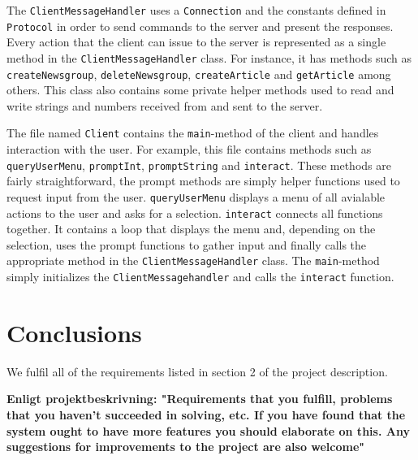 \documentclass[a4paper]{article}
\begin{document}
The \texttt{ClientMessageHandler} uses a \texttt{Connection} and the constants defined in \texttt{Protocol} in order to send commands to the server and present the responses. Every action that the client can issue to the server is represented as a single method in the \texttt{ClientMessageHandler} class. For instance, it has methods such as \texttt{createNewsgroup}, \texttt{deleteNewsgroup}, \texttt{createArticle} and \texttt{getArticle} among others. This class also contains some private helper methods used to read and write strings and numbers received from and sent to the server.

The file named \texttt{Client} contains the \texttt{main}-method of the client and handles interaction with the user. For example, this file contains methods such as \texttt{queryUserMenu}, \texttt{promptInt}, \texttt{promptString} and \texttt{interact}. These methods are fairly straightforward, the prompt methods are simply helper functions used to request input from the user. \texttt{queryUserMenu} displays a menu of all avialable actions to the user and asks for a selection. \texttt{interact} connects all functions together. It contains a loop that displays the menu and, depending on the selection, uses the prompt functions to gather input and finally calls the appropriate method in the \texttt{ClientMessageHandler} class. The \texttt{main}-method simply initializes the \texttt{ClientMessagehandler} and calls the \texttt{interact} function.

\section{Conclusions}
We fulfil all of the requirements listed in section 2 of the project description.


\textbf{Enligt projektbeskrivning:
"Requirements that you fulfill, problems that you haven’t succeeded in solving,
etc. If you have found that the system ought to have more features you should elaborate on
this. Any suggestions for improvements to the project are also welcome"}
\end{document}
